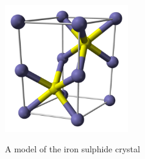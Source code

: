  \begin{minipage}{.5\textwidth}
  \begin{center}
   \includegraphics[width=0.4\textwidth]{photos/FeS_wikipedia.png}\\
\begin{caption}A model of the iron sulphide crystal\end{caption}
  \end{center}

 \end{minipage}

